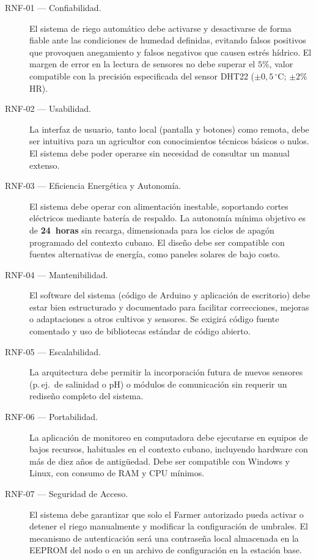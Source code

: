 \begin{description}
	
	\item[RNF-01 — Confiabilidad.]
	El sistema de riego automático debe activarse y desactivarse de forma fiable ante las
	condiciones de humedad definidas, evitando falsos positivos que provoquen anegamiento y
	falsos negativos que causen estrés hídrico. El margen de error en la lectura de sensores
	no debe superar el \(5\%\), valor compatible con la precisión especificada del sensor
	DHT22 (\(\pm0{,}5\,^\circ\)C; \(\pm2\%\) HR).
	
	\item[RNF-02 — Usabilidad.]
	La interfaz de usuario, tanto local (pantalla y botones) como remota, debe ser intuitiva
	para un agricultor con conocimientos técnicos básicos o nulos. El sistema debe poder
	operarse sin necesidad de consultar un manual extenso.
	
	\item[RNF-03 — Eficiencia Energética y Autonomía.]
	El sistema debe operar con alimentación inestable, soportando cortes eléctricos 
	mediante batería de respaldo. La autonomía mínima objetivo es de \textbf{24~horas}
	sin recarga, dimensionada para los ciclos de apagón programado del contexto cubano.
	El diseño debe ser compatible con fuentes alternativas de energía, como paneles
	solares de bajo costo.
	
	\item[RNF-04 — Mantenibilidad.]
	El software del sistema (código de Arduino y aplicación de escritorio) debe estar bien
	estructurado y documentado para facilitar correcciones, mejoras o adaptaciones a otros
	cultivos y sensores. Se exigirá código fuente comentado y uso de bibliotecas estándar
	de código abierto.
	
	\item[RNF-05 — Escalabilidad.]
	La arquitectura debe permitir la incorporación futura de nuevos sensores (p.\,ej.\ de
	salinidad o pH) o módulos de comunicación sin requerir un rediseño completo del sistema.
	
	\item[RNF-06 — Portabilidad.]
	La aplicación de monitoreo en computadora debe ejecutarse en equipos de bajos recursos,
	habituales en el contexto cubano, incluyendo hardware con más de diez años de
	antigüedad. Debe ser compatible con Windows y Linux, con consumo de RAM y CPU mínimos.
	
	\item[RNF-07 — Seguridad de Acceso.]
	El sistema debe garantizar que solo el Farmer autorizado pueda activar o detener el
	riego manualmente y modificar la configuración de umbrales. El mecanismo de
	autenticación será una contraseña local almacenada en la EEPROM del nodo o en un
	archivo de configuración en la estación base.
	

\end{description}
